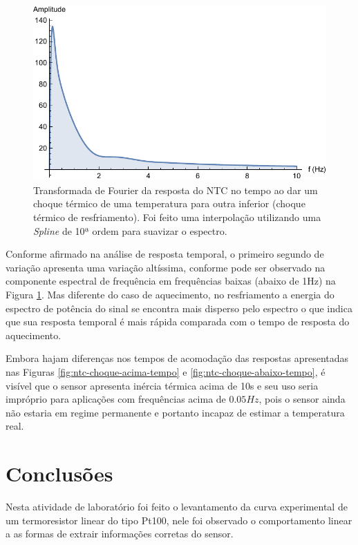 \documentclass[a4paper]{instrumentacao}
\begin{document}
\begin{figure}[H]
\center
\includegraphics[width=\textwidth]{ThermalShock-Down-Frequency.pdf}
\caption{Transformada de Fourier da resposta do NTC no tempo ao dar um choque térmico de uma temperatura para outra inferior (choque térmico de resfriamento). Foi feito uma interpolação utilizando uma \textit{Spline} de 10ª ordem para suavizar o espectro.}
\label{fig:ntc-choque-abaixo-frequencia}
\end{figure}

Conforme afirmado na análise de resposta temporal, o primeiro segundo de variação apresenta uma variação altíssima, conforme pode ser observado na componente espectral de frequência em frequências baixas (abaixo de 1Hz) na Figura \ref{fig:ntc-choque-abaixo-frequencia}. Mas diferente do caso de aquecimento, no resfriamento a energia do espectro de potência do sinal se encontra mais disperso pelo espectro o que indica que sua resposta temporal é mais rápida comparada com o tempo de resposta do aquecimento.

Embora hajam diferenças nos tempos de acomodação das respostas apresentadas nas Figuras \ref{fig:ntc-choque-acima-tempo} e \ref{fig:ntc-choque-abaixo-tempo}, é visível que o sensor apresenta inércia térmica acima de 10s e seu uso seria impróprio para aplicações com frequências acima de $0.05Hz$, pois o sensor ainda não estaria em regime permanente e portanto incapaz de estimar a temperatura real.

\chapter{Conclusões}
Nesta atividade de laboratório foi feito o levantamento da curva experimental de um termoresistor linear do tipo Pt100, nele foi observado o comportamento linear a as formas de extrair informações corretas do sensor.
\end{document}
